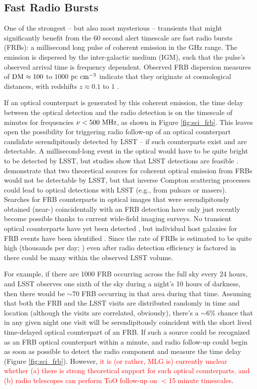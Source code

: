 \documentclass[DM,lsstdraft,authoryear,toc]{lsstdoc}
\begin{document}
\subsection{Fast Radio Bursts}\label{ssec:latency_frb}

One of the strongest -- but also most mysterious -- transients that might significantly benefit from the $60$ second alert timescale are fast radio bursts (FRBs): a millisecond long pulse of coherent emission in the GHz range.
The emission is dispersed by the inter-galactic medium (IGM), such that the pulse's observed arrival time is frequency dependent.
Observed FRB dispersion measures of $\rm{DM}\approx100$ to $1000$ $\rm pc\ cm^{-3}$ indicate that they originate at cosmological distances, with redshifts $z\approx0.1$ to $1$ \citep{2018Natur.562..386S}. 

If an optical counterpart is generated by this coherent emission, the time delay between the optical detection and the radio detection is on the timescale of minutes for frequencies $\nu < 500\ {\rm MHz}$, as shown in Figure \ref{fig:sci_frb}.
This leaves open the possibility for triggering radio follow-up of an optical counterpart candidate serendipitously detected by LSST -- if such counterparts exist and are detectable.
A millisecond-long event in the optical would have to be quite bright to be detected by LSST, but studies show that LSST detections are feasible \citep{2016ApJ...824L..18L}.
\cite{2019ApJ...878...89Y} demonstrate that two theoretical sources for coherent optical emission from FRBs would not be detectable by LSST, but that inverse Compton scattering processes could lead to optical detections with LSST (e.g., from pulsars or masers).
Searches for FRB counterparts in optical images that were serendipitously obtained (near-) coincidentally with an FRB detection have only just recently become possible thanks to current wide-field imaging surveys.
No transient optical counterparts have yet been detected \citep{2019ApJ...881...30T}, but individual host galaxies for FRB events have been identified \citep{2016Natur.530..453K}.
Since the rate of FRBs is estimated to be quite high (thousands per day; \citealt{2016MNRAS.460L..30C}) even after radio detection efficiency is factored in there could be many within the observed LSST volume. 

For example, if there are 1000 FRB occurring across the full sky every 24 hours, and LSST observes one sixth of the sky during a night's 10 hours of darkness, then there would be $\sim70$ FRB occurring in that area during that time.
Assuming that both the FRB and the LSST visits are distributed randomly in time and location (although the visits are correlated, obviously), there's a $\sim6\%$ chance that in any given night one visit will be serendipitously coincident with the short lived time-delayed optical counterpart of an FRB.
If such a source could be recognized as an FRB optical counterpart within a minute, and radio follow-up could begin as soon as possible to detect the radio component and measure the time delay (Figure \ref{fig:sci_frb}).  
However, \textcolor{red}{it is (or rather, MLG is) currently unclear whether (a) there is strong theoretical support for such optical counterparts, and (b) radio telescopes can perform ToO follow-up on $<$15 minute timescales}.
\end{document}
